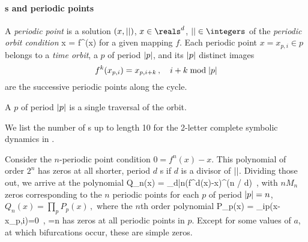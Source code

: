 \paragraph{{\Orbit}s and periodic points}

A \emph{periodic point} is a
solution $(x,{||})$, $x \in \reals^{d}$,
$\cl{} \in \integers$ of the {\em periodic orbit condition}
\beq
x = f^\cl{}(x)
for a given mapping $f$.
Each periodic point
$x=x_{p,i} \in p$
belongs to a \emph{time orbit}, a \emph{{\orbit}} $p$ of period ${|p|}$,
and its  ${|p|}$ distinct images
\[
f^k(x_{p,i})=x_{p,i+k}\,,\quad i+k \;\mbox{mod}\; {|p|}
\]
are the successive periodic points
along the cycle.

A {\em {\orbit}}
$p$ of period ${|p|}$ is
a single traversal of the orbit.


We list the number of {\orbit}s up to length 10
for the 2-letter complete symbolic dynamics
in .

%
%
%
%
%
Consider the $n$-periodic point condition $0=f^n(x)-x$. This
polynomial of order $2^n$ has zeros at all
shorter, period $d$ {\orbit}s  if $d$ is a divisor of ${||}$.
Dividing those out, we arrive at the polynomial
\beq
Q_n(x) = \prod_{d|n}\left(f^d(x)-x\right)^{\mu({n / d})}
\,,
 with $nM_n$ zeros corresponding to the $n$ periodic points
for each {\orbit} $p$ of period ${|p|}=n$,
$
Q_n(x)= \prod_p P_p(x)
\,,
$
where the $n$th order polynomial
\beq
P_p(x) = \prod_{i\in p}(x-x_{p,i})=0
    \,,\qquad
{}=n
has zeros at all periodic points in {\orbit} $p$.
Except for some values of $a$, at which bifurcations occur,
these are simple zeros.

